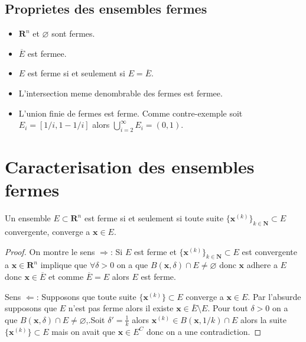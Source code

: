 \subsection{Proprietes des ensembles fermes}
\begin{itemize}
\item $\mathbf{R}^{n}$ et $\varnothing$ sont fermes.
\item $\overline{E}$ est fermee.
\item $E$ est ferme si et seulement si $E=\overline{E}$.
\item L'intersection meme denombrable des fermes est fermee.
\item L'union finie de fermes est ferme. Comme contre-exemple soit $E_{i}=[1/i,1-1/i]$ alors $\bigcup _{i=2}^{\infty}E_{i}=(0,1)$.
\end{itemize}

\section{Caracterisation des ensembles fermes}

\begin{lemma}
Un ensemble $E\subset \mathbf{R}^{n}$ est ferme si et seulement si toute suite $\{ \boldsymbol{x}^{(k)} \}_{k\in \mathbf{N}}\subset E$ convergente, converge a $\boldsymbol{x}\in E$.
\end{lemma}
\begin{proof}

On montre le sens $\Rightarrow$: Si $E$ est ferme et $\{ \boldsymbol{x}^{(k)} \}_{k\in \mathbf{N}}\subset E$ est convergente a $\boldsymbol{x}\in \mathbf{R}^{n}$ implique que $\forall\delta>0$ on a que $B(\boldsymbol{x},\delta)\cap E\neq \varnothing$ donc $\boldsymbol{x}$ adhere a $E$ donc $\boldsymbol{x}\in \overline{E}$ et comme $\overline{E}=E$ alors $E$ est ferme. 

Sens $\Leftarrow$: Supposons que toute suite $\{ \boldsymbol{x}^{(k)} \}\subset E$ converge a $\boldsymbol{x}\in E$. Par l'absurde supposons que $E$ n'est pas ferme alors il existe $\boldsymbol{x}\in\bar{E}\setminus E$. Pour tout $\delta>0$ on a que $B(\boldsymbol{x},\delta)\cap E\neq \varnothing$,.Soit $\delta'=\frac{1}{k}$ alors $\boldsymbol{x}^{(k)}\in B(\boldsymbol{x},1/k)\cap E$ alors la suite $\{ \boldsymbol{x}^{(k)} \}\subset E$ mais on avait que $\boldsymbol{x}\in E^{C}$ donc on a une contradiction.
\end{proof}

